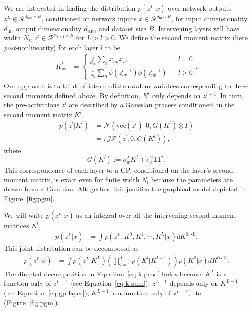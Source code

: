 \documentclass{article} %
\newcommand{\mb}{\mathbf}
\newcommand{\mc}{\mathcal}
\begin{document}
\begin{appendix}
We are interested in finding the distribution $p( z^L | x )$ over network outputs $z^L \in \mc R^{d_{\text{out}} \times B}$, conditioned on network inputs $x \in \mc R^{d_{\text{in}} \times B}$, for input dimensionality $d_{\text{in}}$, output dimensionality $d_{\text{out}}$, and dataset size $B$. Intervening layers will have width $N_{l}$, $z^l \in \mc R^{N_{l+1}\times B}$ for $L > l > 0$. We define the second moment matrix (here {\em post}-nonlinearity) for each layer $l$ to be
\begin{align}
K^l_{ab}  &= 
	\left\{\begin{array}{ccc}
		\frac{1}{d_{\text{in}}} \sum_n x_{na} x_{nb} & & l = 0 \\
		\frac{1}{N_{l}} \sum_n \phi(z_{na}^{l-1}) \phi(z_{nb}^{l-1}) & & l > 0 \label{eq k sum}
	\end{array}\right.
.
\end{align}
Our approach is to think of intermediate random variables corresponding to these second moments defined above. By definition, $K^{l}$ only depends on $z^{l-1}$. In turn, the pre-activations $z^l$ are described by a Gaussian process conditioned on the second moment matrix $K^l$,
\begin{align}
p( z^l | K^l ) &= \mc N\left( \text{vec}\left( z^l \right); 0, G\left( K^l \right) \otimes I \right) \nonumber \\
&=: \mc {GP} \left( z^l; 0, G\left( K^l \right) \right), \label{eq gp layer}
\end{align}
where
\begin{equation}
G\left( K^l \right) := \sigma^2_w K^l + \sigma^2_b \mb 1 \mb 1^T
.
\end{equation}
This correspondence of each layer to a GP, conditioned on the layer's second moment matrix, is exact even for finite width $N_{l}$ because the parameters are drawn from a Gaussian. Altogether, this justifies the graphical model depicted in Figure~\ref{fig:pgm}.

We will write $p( z^L | x )$ as an integral over all the intervening second moment matrices $K^l$, 
\begin{align}
p( z^L | x ) &= \int p\left( z^L, K^0, K^1, \cdots, K^L | x\right) dK^{0\cdots L}.
\end{align}
This joint distribution can be decomposed as
\begin{align}
p( z^L | x ) &= \int p( z^L | K^L ) \left( \prod_{l=1}^L  p( K^l | K^{l-1} ) \right) p( K^0 | x) dK^{0\cdots L} \label{eq k prod}
.
\end{align}
The directed decomposition in Equation~\ref{eq k prod} holds because $K^L$ is a function only of $z^{L-1}$ (see Equation~\ref{eq k sum}), $z^{L-1}$ depends only on $K^{L-1}$ (see Equation~\ref{eq gp layer}), $K^{L-1}$ is a function only of $z^{L-2}$, etc (Figure~\ref{fig:pgm}).


\end{appendix}
\end{document}
